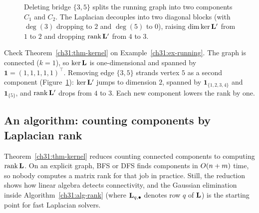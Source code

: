 \begin{figure}[htbp]
\caption{Deleting bridge $\{3,5\}$ splits the running graph into two components $C_1$ and $C_2$. The Laplacian decouples into two diagonal blocks (with $\deg(3)$ dropping to $2$ and $\deg(5)$ to $0$), raising $\dim\ker\mathbf{L}'$ from $1$ to $2$ and dropping $\operatorname{rank}\mathbf{L}'$ from $4$ to $3$.}
\label{ch31:fig-components-kernel}
\end{figure}

\begin{labbox}
Check Theorem~\ref{ch31:thm-kernel} on Example~\ref{ch31:ex-running}. The graph is connected ($k=1$), so $\ker\mathbf{L}$ is one-dimensional and spanned by $\mathbf{1}=(1,1,1,1,1)^\top$. Removing edge $\{3,5\}$ strands vertex $5$ as a second component (Figure~\ref{ch31:fig-components-kernel}): $\ker\mathbf{L}'$ jumps to dimension $2$, spanned by $\mathbf{1}_{\{1,2,3,4\}}$ and $\mathbf{1}_{\{5\}}$, and $\operatorname{rank}\mathbf{L}'$ drops from $4$ to $3$. Each new component lowers the rank by one.
\end{labbox}

\subsection{An algorithm: counting components by Laplacian rank}

Theorem~\ref{ch31:thm-kernel} reduces counting connected components to computing $\operatorname{rank}\mathbf{L}$. On an explicit graph, BFS or DFS finds components in $O(n+m)$ time, so nobody computes a matrix rank for that job in practice. Still, the reduction shows how linear algebra detects connectivity, and the Gaussian elimination inside Algorithm~\ref{ch31:alg-rank} (where $\mathbf{L}_{q,\bullet}$ denotes row $q$ of $\mathbf{L}$) is the starting point for fast Laplacian solvers.

